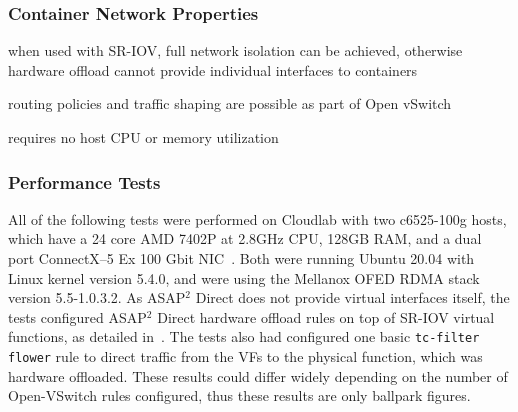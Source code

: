 \documentclass[12pt,titlepage]{article}
\begin{document}
\subsubsection*{Container Network Properties}
\begin{description}[nolistsep,font={{\scshape\bfseries}}]
	\item[Network Isolation] when used with SR-IOV, full network isolation can be achieved, otherwise hardware offload cannot provide individual interfaces to containers
	\item[Controllability] routing policies and traffic shaping are possible as part of Open vSwitch
	\item[Resource Utilization] requires no host CPU or memory utilization
\end{description}

\subsubsection*{Performance Tests}
All of the following tests were performed on Cloudlab with two c6525-100g hosts, which have a 24 core AMD 7402P at 2.8GHz CPU, 128GB RAM, and a dual port ConnectX--5 Ex 100 Gbit NIC~\cite{cloudlab}. 
Both were running Ubuntu 20.04 with Linux kernel version 5.4.0, and were using the Mellanox OFED RDMA stack version 5.5-1.0.3.2.
As ASAP$^2$ Direct does not provide virtual interfaces itself, the tests configured ASAP$^2$ Direct hardware offload rules on top of SR-IOV virtual functions, as detailed in~\cite{mellanoxdockerovs}.
The tests also had configured one basic \texttt{tc-filter flower} rule to direct traffic from the VFs to the physical function, which was hardware offloaded.
These results could differ widely depending on the number of Open-VSwitch rules configured, thus these results are only ballpark figures.
\end{document}
